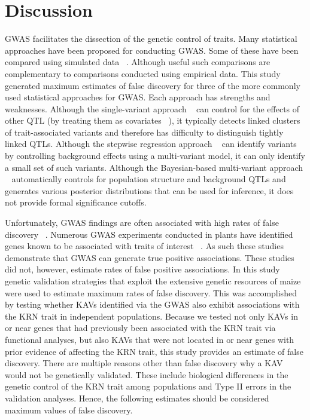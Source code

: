 \documentclass[10pt,letterpaper]{article}
\begin{document}
\section*{Discussion}
GWAS facilitates the dissection of the genetic control of traits. Many statistical approaches have been proposed for conducting GWAS. Some of these have been compared using simulated data ~\cite{Galesloot2014}. Although useful such comparisons are complementary to comparisons conducted using empirical data.  This study generated maximum estimates of false discovery for three of the more commonly used statistical approaches for GWAS. Each approach has strengths and weaknesses. Although the single-variant approach ~\cite{Balding2006} can control for the effects of other QTL (by treating them as covariates ~\cite{Kang2010}), it typically detects linked clusters of trait-associated variants and therefore has difficulty to distinguish tightly linked QTLs. Although the stepwise regression approach ~\cite{Segura2012} can identify variants by controlling background effects using a multi-variant model, it can only identify a small set of such variants. Although the Bayesian-based multi-variant approach ~\cite{Habier2011} automatically controls for population structure and background QTLs and generates various posterior distributions that can be used for inference, it does not provide formal significance cutoffs. 

Unfortunately, GWAS findings are often associated with high rates of false discovery ~\cite{Visscher2012}. Numerous GWAS experiments conducted in plants have identified genes known to be associated with traits of interest ~\cite{Larsson2013}. As such these studies demonstrate that GWAS can generate true positive associations. These studies did not, however, estimate rates of false positive associations. In this study genetic validation strategies that exploit the extensive genetic resources of maize were used to estimate maximum rates of false discovery. This was accomplished by testing whether KAVs identified via the GWAS also exhibit associations with the KRN trait in independent populations. Because we tested not only KAVs in or near genes that had previously been associated with the KRN trait via functional analyses, but also KAVs that were not located in or near genes with prior evidence of affecting the KRN trait, this study provides an estimate of false discovery. There are multiple reasons other than false discovery why a KAV would not be genetically validated. These include biological differences in the genetic control of the KRN trait among populations and Type II errors in the validation analyses. Hence, the following estimates should be considered maximum values of false discovery.
\end{document}
